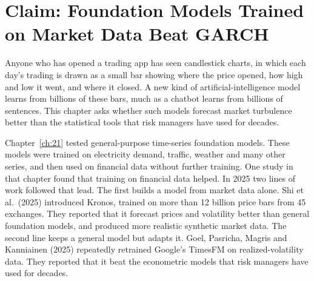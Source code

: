 \makeatletter
{}
\makeatother

\makeatletter
\makeatother

\chapter{Claim: Foundation Models Trained on Market Data Beat GARCH}
\label{ch:23}

Anyone who has opened a trading app has seen candlestick charts, in which each day's trading is drawn as a small bar showing where the price opened, how high and low it went, and where it closed. A new kind of artificial-intelligence model learns from billions of these bars, much as a chatbot learns from billions of sentences. This chapter asks whether such models forecast market turbulence better than the statistical tools that risk managers have used for decades.

Chapter~\ref{ch:21} tested general-purpose time-series foundation models. These models were trained on electricity demand, traffic, weather and many other series, and then used on financial data without further training. One study in that chapter found that training on financial data helped. In 2025 two lines of work followed that lead. The first builds a model from market data alone. Shi et al.\ (2025) introduced Kronos, trained on more than 12 billion price bars from 45 exchanges. They reported that it forecast prices and volatility better than general foundation models, and produced more realistic synthetic market data. The second line keeps a general model but adapts it. Goel, Pasricha, Magris and Kanniainen (2025) repeatedly retrained Google's TimesFM on realized-volatility data. They reported that it beat the econometric models that risk managers have used for decades.

